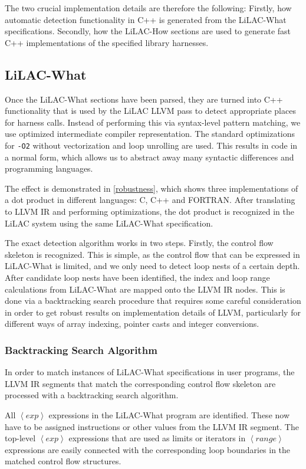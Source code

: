 The two crucial implementation details are therefore the following:
Firstly, how automatic detection functionality in C++ is generated from the
LiLAC-What specifications.\linebreak
Secondly, how the LiLAC-How sections are used to generate fast C++
implementations of the specified library harnesses.

\subsection{LiLAC-What}
Once the LiLAC-What sections have been parsed, they are turned into C++
functionality that is used by the LiLAC LLVM pass to detect appropriate places
for harness calls.
Instead of performing this via syntax-level pattern matching, we use optimized
intermediate compiler representation.
The standard optimizations for \texttt{-O2} without vectorization and loop
unrolling are used.
This results in code in a normal form, which allows us to abstract away many
syntactic differences and programming languages.

The effect is demonstrated in \autoref{robustness}, which shows three
implementations of a dot product in different languages: C, C++ and FORTRAN.
After translating to LLVM IR and performing optimizations, the dot product is
recognized in the LiLAC system using the same LiLAC-What specification.

The exact detection algorithm works in two steps.
Firstly, the control flow skeleton is recognized.
This is simple, as the control flow that can be expressed in LiLAC-What is
limited, and we only need to detect loop nests of a certain depth.
After candidate loop nests have been identified, the index and loop range
calculations from LiLAC-What are mapped onto the LLVM IR nodes.
This is done via a backtracking search procedure that requires some careful
consideration in order to get robust results on implementation details of LLVM,
particularly for different ways of array indexing, pointer casts and integer
conversions.

\subsubsection{Backtracking Search Algorithm}
In order to match instances of LiLAC-What specifications in user programs,
the LLVM IR segments that match the corresponding control flow skeleton are
processed with a backtracking search algorithm.

All $\left<exp\right>$ expressions in the LiLAC-What program are identified.
These now have to be assigned instructions or other values from the LLVM IR
segment. The top-level $\left<exp\right>$ expressions that are used as limits or
iterators in $\left<range\right>$ expressions are easily connected with the
corresponding loop boundaries in the matched control flow structures.

